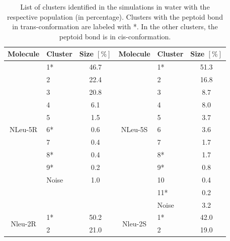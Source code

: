 \begin{table}[h!]
\center
\caption{List of clusters identified in the simulations in water with the respective population (in percentage). Clusters with the peptoid bond in trans-conformation are labeled with *. In the other clusters, the peptoid bond is in cis-conformation.}
\label{tab: SIClusterTransWater}
  \begin{adjustbox}{max width=\textwidth}
\begin{tabular}{c|lc||c|lc}
Molecule                  & Cluster & Size $[\%]$ & Molecule                  & Cluster & Size $[\%]$ \\
\hline
\multirow{11}{*}{NLeu-5R} & 1*      & 46.7        & \multirow{11}{*}{NLeu-5S} & 1*      & 51.3        \\
                          & 2       & 22.4       &                            & 2       & 16.8        \\
                          & 3       & 20.8        &                           & 3       & 8.7         \\
                          & 4       & 6.1        &                            & 4       & 8.0         \\
                          & 5       & 1.5        &                            & 5       & 3.7         \\
                          & 6*      & 0.6         &                           & 6       & 3.6         \\
                          & 7       & 0.4         &                           & 7       & 1.7         \\
                          & 8*      & 0.4         &                           & 8*      & 1.7         \\
                          & 9*      & 0.2         &                           & 9*      & 0.8         \\
                          & Noise   & 1.0         &                           & 10      & 0.4         \\
                          &         &             &                           & 11*     & 0.2         \\
                          &         &             &                           & Noise   & 3.2        \\
\hline
\multirow{6}{*}{Nleu-2R}  & 1*      & 50.2        & \multirow{13}{*}{Nleu-2S} & 1*      & 42.0        \\
                          & 2       & 21.0        &                           & 2       & 19.0        \\

\end{tabular}
\end{adjustbox}
\end{table}
